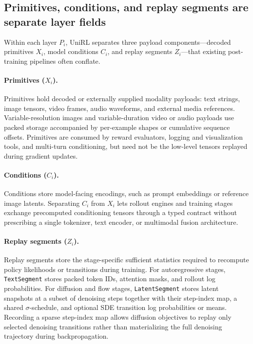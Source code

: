 \documentclass[10pt]{article}
\begin{document}
\subsection{Primitives, conditions, and replay segments are separate layer fields}

Within each layer $P_i$, UniRL separates three payload components---decoded primitives $X_i$, model conditions $C_i$, and replay segments $Z_i$---that existing post-training pipelines often conflate.

\paragraph{Primitives ($X_i$).}
Primitives hold decoded or externally supplied modality payloads: text strings, image tensors, video frames, audio waveforms, and external media references.
Variable-resolution images and variable-duration video or audio payloads use packed storage accompanied by per-example shapes or cumulative sequence offsets.
Primitives are consumed by reward evaluators, logging and visualization tools, and multi-turn conditioning, but need not be the low-level tensors replayed during gradient updates.

\paragraph{Conditions ($C_i$).}
Conditions store model-facing encodings, such as prompt embeddings or reference image latents.
Separating $C_i$ from $X_i$ lets rollout engines and training stages exchange precomputed conditioning tensors through a typed contract without prescribing a single tokenizer, text encoder, or multimodal fusion architecture.

\paragraph{Replay segments ($Z_i$).}
Replay segments store the stage-specific sufficient statistics required to recompute policy likelihoods or transitions during training.
For autoregressive stages, \texttt{TextSegment} stores packed token IDs, attention masks, and rollout log probabilities.
For diffusion and flow stages, \texttt{LatentSegment} stores latent snapshots at a subset of denoising steps together with their step-index map, a shared $\sigma$-schedule, and optional SDE transition log probabilities or means.
Recording a sparse step-index map allows diffusion objectives to replay only selected denoising transitions rather than materializing the full denoising trajectory during backpropagation.
\end{document}
